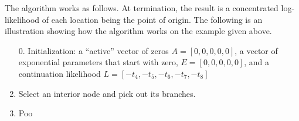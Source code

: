 \documentclass[11pt]{article}
\begin{document}
The algorithm works as follows. At termination, the result is a concentrated log-likelihood of each location being the point of origin.  The following is an illustration showing how the algorithm works on the example given above.

\begin{enumerate}
\item[0.] Initialization: a ``active'' vector of zeros $A=[0,0,0,0,0]$, a vector of exponential parameters that start with zero, $E=[0,0,0,0,0]$, and a continuation likelihood $L=[-t_4,-t_5,-t_6,-t_7,-t_8]$
\item  Select an interior node and pick out its branches.
\item  Poo
\end{enumerate}
\end{document}
